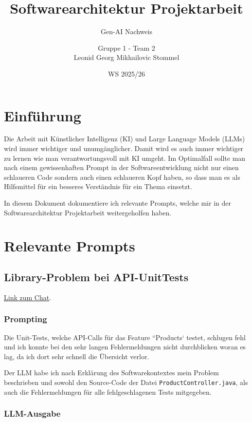 \documentclass[12pt, a4paper]{scrreprt}
\title{Softwarearchitektur Projektarbeit}
\subtitle{Gen-AI Nachweis}
\author{Gruppe 1 - Team 2\\Leonid Georg Mikhailovic Stommel}
\date{WS 2025/26}
\begin{document}
	\maketitle
	
	\tableofcontents
	
	\chapter{Einführung}
	

	Die Arbeit mit Künstlicher Intelligenz (KI) und Large Language Models (LLMs) wird immer wichtiger und unumgänglicher. Damit wird es auch immer wichtiger zu lernen wie man verantwortungsvoll mit KI umgeht. Im Optimalfall sollte man nach einem gewissenhaften Prompt in der Softwareentwicklung nicht nur einen schlaueren Code sondern auch einen schlaueren Kopf haben, so dass man es als Hilfsmittel für ein besseres Verständnis für ein Thema einsetzt. 
		
	In diesem Dokument dokumentiere ich relevante Prompts, welche mir in der Softwarearchitektur Projektarbeit weitergeholfen haben.
	
	\chapter{Relevante Prompts}
	
	\section{Library-Problem bei API-UnitTests}
	
	\href{https://gemini.google.com/share/6b4ea303c9ce}{Link zum Chat}.
	
	\subsection{Prompting}

		Die Unit-Tests, welche API-Calls für das Feature ``Products` testet, schlugen fehl und ich konnte bei den sehr langen Fehlermeldungen nicht durchblicken woran es lag, da ich dort sehr schnell die Übersicht verlor.

		Der LLM habe ich nach Erklärung des Softwarekontextes mein Problem beschrieben und sowohl den Source-Code der Datei \texttt{ProductController.java}, als auch die Fehlermeldungen für alle fehlgeschlagenen Tests mitgegeben.
	
	\subsection{LLM-Ausgabe}
	
\end{document}

